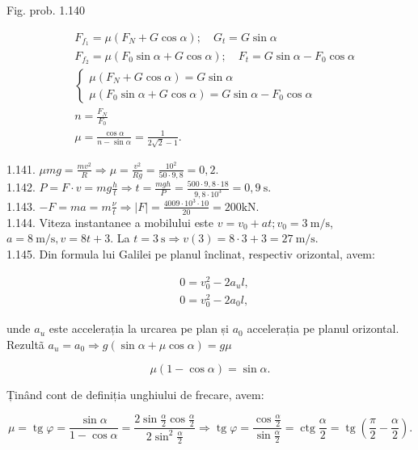 Fig. prob. 1.140

$$
\begin{aligned}
& F_{f_{1}}=\mu\left(F_{N}+G \cos \alpha\right) ; \quad G_{t}=G \sin \alpha \\
& F_{f_{2}}=\mu\left(F_{0} \sin \alpha+G \cos \alpha\right) ; \quad F_{t}=G \sin \alpha-F_{0} \cos \alpha \\
& \left\{\begin{array}{l}
\mu\left(F_{N}+G \cos \alpha\right)=G \sin \alpha \\
\mu\left(F_{0} \sin \alpha+G \cos \alpha\right)=G \sin \alpha-F_{0} \cos \alpha
\end{array}\right. \\
& n=\frac{F_{N}}{F_{0}} \\
& \mu=\frac{\cos \alpha}{n-\sin \alpha}=\frac{1}{2 \sqrt{2}-1} .
\end{aligned}
$$

1.141. $\mu m g=\frac{m v^{2}}{R} \Rightarrow \mu=\frac{v^{2}}{R g}=\frac{10^{2}}{50 \cdot 9,8}=0,2$.\\
1.142. $P=F \cdot v=m g \frac{h}{t} \Rightarrow t=\frac{m g h}{P}=\frac{500 \cdot 9,8 \cdot 18}{9,8 \cdot 10^{3}}=0,9 \mathrm{~s}$.\\
1.143. $-F=m a=m \frac{\nu}{t} \Rightarrow|F|=\frac{4009 \cdot 10^{3} \cdot 10}{20}=200 \mathrm{kN}$.\\
1.144. Viteza instantanee a mobilului este $v=v_{0}+a t ; v_{0}=3 \mathrm{~m} / \mathrm{s}$, $a=8 \mathrm{~m} / \mathrm{s}, v=8 t+3$. La $t=3 \mathrm{~s} \Rightarrow v(3)=8 \cdot 3+3=27 \mathrm{~m} / \mathrm{s}$.\\
1.145. Din formula lui Galilei pe planul înclinat, respectiv orizontal, avem:

$$
\begin{aligned}
& 0=v_{0}^{2}-2 a_{u} l, \\
& 0=v_{0}^{2}-2 a_{0} l,
\end{aligned}
$$

unde $a_{u}$ este accelerația la urcarea pe plan și $a_{0}$ accelerația pe planul orizontal.\\
Rezultã $a_{u}=a_{0} \Rightarrow g(\sin \alpha+\mu \cos \alpha)=g \mu$

$$
\mu(1-\cos \alpha)=\sin \alpha .
$$

Ținând cont de definiția unghiului de frecare, avem:

$$
\mu=\operatorname{tg} \varphi=\frac{\sin \alpha}{1-\cos \alpha}=\frac{2 \sin \frac{\alpha}{2} \cos \frac{\alpha}{2}}{2 \sin ^{2} \frac{\alpha}{2}} \Rightarrow \operatorname{tg} \varphi=\frac{\cos \frac{\alpha}{2}}{\sin \frac{\alpha}{2}}=\operatorname{ctg} \frac{\alpha}{2}=\operatorname{tg}\left(\frac{\pi}{2}-\frac{\alpha}{2}\right) .
$$


